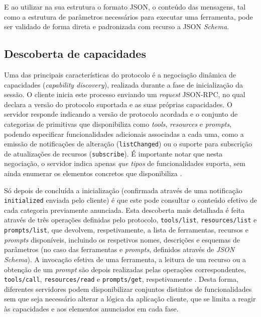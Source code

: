 E ao utilizar na sua estrutura o formato JSON, o conteúdo das mensagens, tal como a estrutura de parâmetros necessários para executar uma ferramenta, pode ser validado de forma direta e padronizada com recurso a JSON \textit{Schema}.

\subsection{Descoberta de capacidades}

Uma das principais características do protocolo é a negociação dinâmica de
capacidades (\textit{capability discovery}), realizada durante a fase de
inicialização da sessão. O cliente inicia este processo enviando um \textit{request}
JSON-RPC, no qual declara a versão do protocolo
suportada e as suas próprias capacidades. O servidor responde indicando a
versão de protocolo acordada e o conjunto de categorias de primitivas que
disponibiliza como \textit{tools}, \textit{resources} e \textit{prompts},
podendo especificar funcionalidades adicionais associadas a cada uma,
como a emissão de notificações de alteração (\texttt{listChanged}) ou o
suporte para subscrição de atualizações de recursos (\texttt{subscribe}).
É importante notar que nesta negociação, o servidor
indica apenas \textit{que tipos} de funcionalidades suporta, sem ainda
enumerar os elementos concretos que disponibiliza \cite{mcp_server_concepts}.

Só depois de concluída a inicialização (confirmada através de uma notificação \texttt{initialized} enviada pelo cliente) é que este pode consultar o conteúdo efetivo de cada categoria previamente anunciada. Esta descoberta mais detalhada é feita através de três operações definidas pelo protocolo, \texttt{tools/list}, \texttt{resources/list} e \texttt{prompts/list}, que devolvem, respetivamente, a lista de ferramentas, recursos e \textit{prompts} disponíveis, incluindo os respetivos nomes, descrições e esquemas de parâmetros (no caso das ferramentas e \textit{prompts}, definidos através de \textit{JSON Schema}). A invocação efetiva de uma ferramenta, a leitura de um recurso ou a obtenção de um \textit{prompt} são depois realizadas pelas operações correspondentes, \texttt{tools/call}, \texttt{resources/read} e \texttt{prompts/get}, respetivamente \cite{mcp_server_concepts,mcp_client_concepts}. Desta forma, diferentes servidores podem disponibilizar conjuntos distintos de funcionalidades sem que seja necessário alterar a lógica da aplicação cliente, que se limita a reagir às capacidades e aos elementos anunciados em cada fase.

